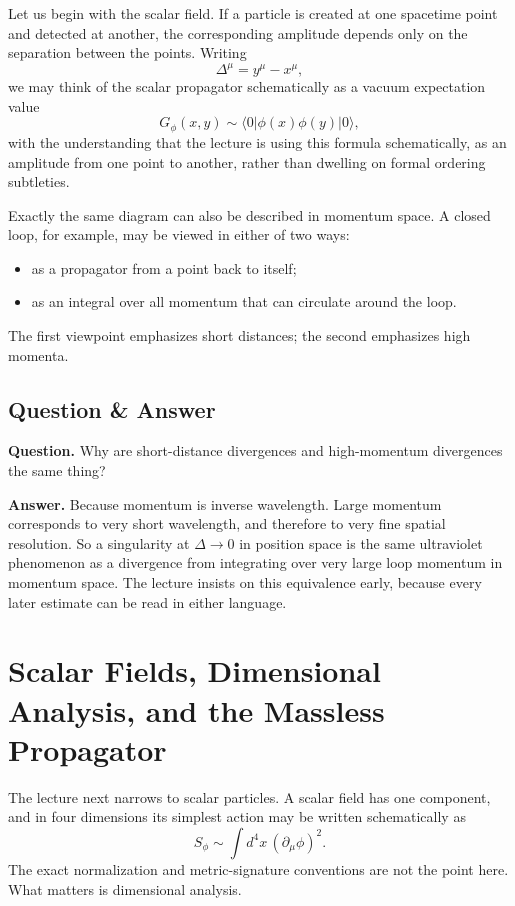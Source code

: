 Let us begin with the scalar field. If a particle is created at one spacetime point and detected at another, the corresponding amplitude depends only on the separation between the points. Writing
\begin{equation}
\Delta^\mu = y^\mu - x^\mu,
\end{equation}
we may think of the scalar propagator schematically as a vacuum expectation value
\begin{equation}
G_\phi(x,y) \sim \langle 0 | \phi(x)\phi(y) | 0 \rangle,
\end{equation}
with the understanding that the lecture is using this formula schematically, as an amplitude from one point to another, rather than dwelling on formal ordering subtleties.

Exactly the same diagram can also be described in momentum space. A closed loop, for example, may be viewed in either of two ways:
\begin{itemize}
\item as a propagator from a point back to itself;
\item as an integral over all momentum that can circulate around the loop.
\end{itemize}

The first viewpoint emphasizes short distances; the second emphasizes high momenta.

\subsection{Question \& Answer}

\textbf{Question.} Why are short-distance divergences and high-momentum divergences the same thing?

\textbf{Answer.} Because momentum is inverse wavelength. Large momentum corresponds to very short wavelength, and therefore to very fine spatial resolution. So a singularity at \(\Delta \to 0\) in position space is the same ultraviolet phenomenon as a divergence from integrating over very large loop momentum in momentum space. The lecture insists on this equivalence early, because every later estimate can be read in either language.

\section{Scalar Fields, Dimensional Analysis, and the Massless Propagator}

The lecture next narrows to scalar particles. A scalar field has one component, and in four dimensions its simplest action may be written schematically as
\begin{equation}
S_\phi \sim \int d^4x\, (\partial_\mu \phi)^2.
\end{equation}
The exact normalization and metric-signature conventions are not the point here. What matters is dimensional analysis.

